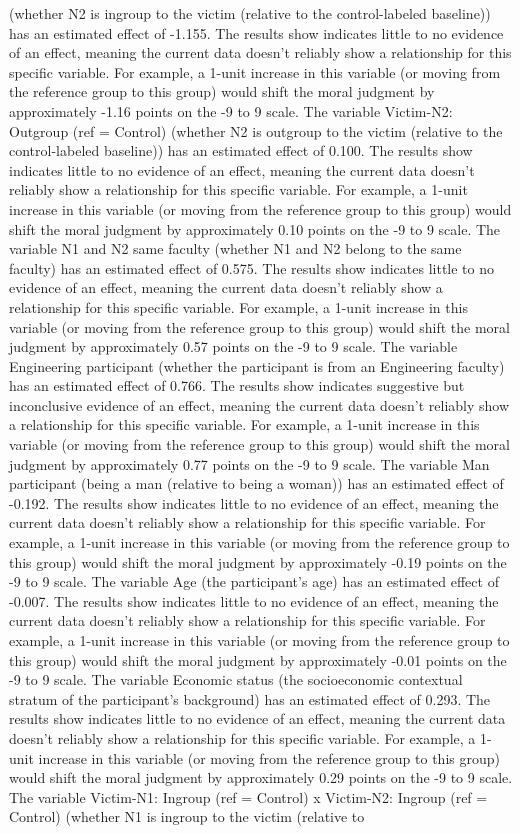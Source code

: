\documentclass[11pt]{article}
\begin{document}
(whether N2 is ingroup to the victim (relative to the control-labeled baseline)) has an estimated effect of -1.155. The results show indicates little to no evidence of an effect, meaning the current data doesn't reliably show a relationship for this specific variable. For example, a 1-unit increase in this variable (or moving from the reference group to this group) would shift the moral judgment by approximately -1.16 points on the -9 to 9 scale. The variable Victim-N2: Outgroup (ref = Control) (whether N2 is outgroup to the victim (relative to the control-labeled baseline)) has an estimated effect of 0.100. The results show indicates little to no evidence of an effect, meaning the current data doesn't reliably show a relationship for this specific variable. For example, a 1-unit increase in this variable (or moving from the reference group to this group) would shift the moral judgment by approximately 0.10 points on the -9 to 9 scale. The variable N1 and N2 same faculty (whether N1 and N2 belong to the same faculty) has an estimated effect of 0.575. The results show indicates little to no evidence of an effect, meaning the current data doesn't reliably show a relationship for this specific variable. For example, a 1-unit increase in this variable (or moving from the reference group to this group) would shift the moral judgment by approximately 0.57 points on the -9 to 9 scale. The variable Engineering participant (whether the participant is from an Engineering faculty) has an estimated effect of 0.766. The results show indicates suggestive but inconclusive evidence of an effect, meaning the current data doesn't reliably show a relationship for this specific variable. For example, a 1-unit increase in this variable (or moving from the reference group to this group) would shift the moral judgment by approximately 0.77 points on the -9 to 9 scale. The variable Man participant (being a man (relative to being a woman)) has an estimated effect of -0.192. The results show indicates little to no evidence of an effect, meaning the current data doesn't reliably show a relationship for this specific variable. For example, a 1-unit increase in this variable (or moving from the reference group to this group) would shift the moral judgment by approximately -0.19 points on the -9 to 9 scale. The variable Age (the participant's age) has an estimated effect of -0.007. The results show indicates little to no evidence of an effect, meaning the current data doesn't reliably show a relationship for this specific variable. For example, a 1-unit increase in this variable (or moving from the reference group to this group) would shift the moral judgment by approximately -0.01 points on the -9 to 9 scale. The variable Economic status (the socioeconomic contextual stratum of the participant's background) has an estimated effect of 0.293. The results show indicates little to no evidence of an effect, meaning the current data doesn't reliably show a relationship for this specific variable. For example, a 1-unit increase in this variable (or moving from the reference group to this group) would shift the moral judgment by approximately 0.29 points on the -9 to 9 scale. The variable Victim-N1: Ingroup (ref = Control) x Victim-N2: Ingroup (ref = Control) (whether N1 is ingroup to the victim (relative to 
\end{document}
